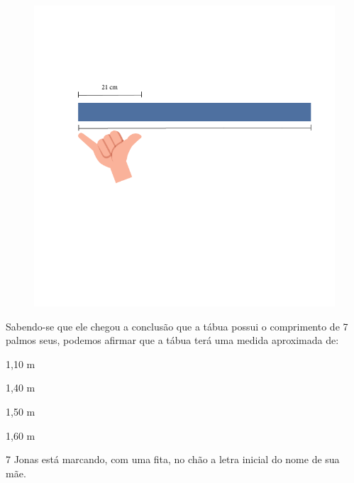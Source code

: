 \begin{figure}[htpb!]
\includegraphics[width=\textwidth]{../ilustracoes/MAT5/SAEB_5ANO_MAT_figura117.png}
\end{figure}

Sabendo-se que ele chegou a conclusão que a tábua possui o comprimento
de 7 palmos seus, podemos afirmar que a tábua terá uma medida aproximada
de:

\begin{escolha}
\item
  1,10 m
\item
  1,40 m
\item
  1,50 m
\item
  1,60 m
\end{escolha}


\num{7} Jonas está marcando, com uma fita, no chão a letra inicial do nome
de sua mãe.

